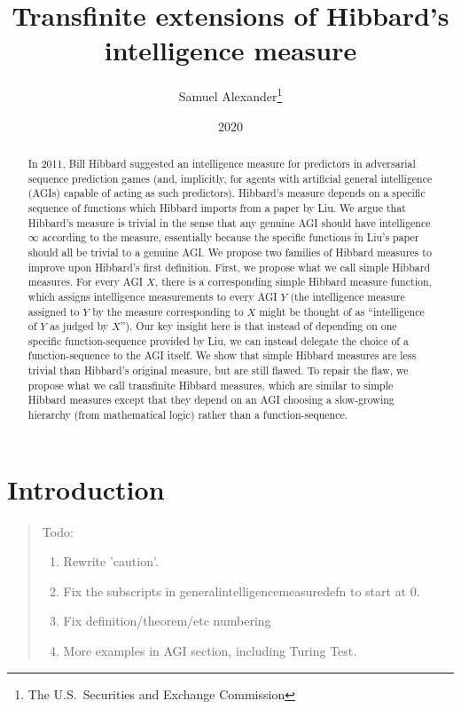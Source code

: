 \documentclass{article}
\title{Transfinite extensions of Hibbard's intelligence measure}
\author{Samuel Alexander\thanks{The U.S.\ Securities and Exchange Commission}}
\date{2020}
\begin{document}
\maketitle

\begin{abstract}
In 2011, Bill Hibbard suggested an intelligence measure for predictors in adversarial
sequence prediction games (and, implicitly, for agents with artificial general intelligence
(AGIs) capable of acting as such
predictors). Hibbard's measure depends on a specific sequence of functions
which Hibbard imports from a paper by Liu. We argue that Hibbard's measure is trivial
in the sense that any genuine AGI should have intelligence $\infty$ according to the
measure, essentially because the specific functions in Liu's paper should all be
trivial to a genuine AGI. We propose two families of Hibbard measures to improve upon
Hibbard's first definition. First, we propose what we call simple Hibbard measures.
For every AGI $X$, there is a corresponding simple Hibbard measure function, which
assigns intelligence measurements to every AGI $Y$ (the intelligence measure assigned
to $Y$ by the measure corresponding to $X$ might be thought of as ``intelligence of $Y$
as judged by $X$''). Our key insight here is that instead of depending on one specific
function-sequence provided by Liu, we can instead delegate the choice of a function-sequence
to the AGI itself. We show that simple Hibbard measures are less trivial than Hibbard's
original measure, but are still flawed. To repair the flaw, we propose what we call
transfinite Hibbard measures, which are similar to simple Hibbard measures except that
they depend on an AGI choosing a slow-growing hierarchy (from mathematical logic) rather
than a function-sequence.
\end{abstract}

\section{Introduction}

\begin{quote}
    Todo:
    \begin{enumerate}
        \item Rewrite 'caution'.
        \item Fix the subscripts in generalintelligencemeasuredefn to start at 0.
        \item Fix definition/theorem/etc numbering
        \item More examples in AGI section, including Turing Test.
    \end{enumerate}
\end{quote}
\end{document}
